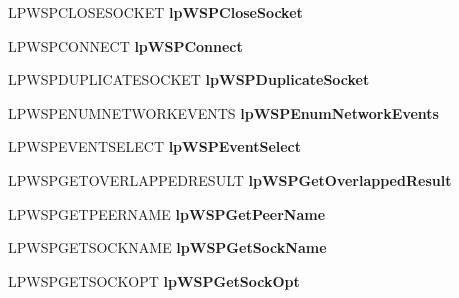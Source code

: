 \begin{DoxyCompactItemize}
L\+P\+W\+S\+P\+C\+L\+O\+S\+E\+S\+O\+C\+K\+ET {\bfseries lp\+W\+S\+P\+Close\+Socket}
\item 
\mbox{\label{struct___w_s_p_p_r_o_c___t_a_b_l_e_aa6f78d8865dce8270c58c33914eecd57}} 
L\+P\+W\+S\+P\+C\+O\+N\+N\+E\+CT {\bfseries lp\+W\+S\+P\+Connect}
\item 
\mbox{\label{struct___w_s_p_p_r_o_c___t_a_b_l_e_ae6a997a41d7a041ebe8ac6eedc61765a}} 
L\+P\+W\+S\+P\+D\+U\+P\+L\+I\+C\+A\+T\+E\+S\+O\+C\+K\+ET {\bfseries lp\+W\+S\+P\+Duplicate\+Socket}
\item 
\mbox{\label{struct___w_s_p_p_r_o_c___t_a_b_l_e_ac87340b48df7256613954854eb04dd40}} 
L\+P\+W\+S\+P\+E\+N\+U\+M\+N\+E\+T\+W\+O\+R\+K\+E\+V\+E\+N\+TS {\bfseries lp\+W\+S\+P\+Enum\+Network\+Events}
\item 
\mbox{\label{struct___w_s_p_p_r_o_c___t_a_b_l_e_a93b29a619eaf54aae3bede3910bc40f2}} 
L\+P\+W\+S\+P\+E\+V\+E\+N\+T\+S\+E\+L\+E\+CT {\bfseries lp\+W\+S\+P\+Event\+Select}
\item 
\mbox{\label{struct___w_s_p_p_r_o_c___t_a_b_l_e_ae85d2b5944fec9a04d3986776a058b62}} 
L\+P\+W\+S\+P\+G\+E\+T\+O\+V\+E\+R\+L\+A\+P\+P\+E\+D\+R\+E\+S\+U\+LT {\bfseries lp\+W\+S\+P\+Get\+Overlapped\+Result}
\item 
\mbox{\label{struct___w_s_p_p_r_o_c___t_a_b_l_e_a46a1d74a124457bf250504c56cb45421}} 
L\+P\+W\+S\+P\+G\+E\+T\+P\+E\+E\+R\+N\+A\+ME {\bfseries lp\+W\+S\+P\+Get\+Peer\+Name}
\item 
\mbox{\label{struct___w_s_p_p_r_o_c___t_a_b_l_e_a2cce40f681a9b0d149bed23e78b869eb}} 
L\+P\+W\+S\+P\+G\+E\+T\+S\+O\+C\+K\+N\+A\+ME {\bfseries lp\+W\+S\+P\+Get\+Sock\+Name}
\item 
\mbox{\label{struct___w_s_p_p_r_o_c___t_a_b_l_e_aa548bd5aed9a30d3241de497acb2f767}} 
L\+P\+W\+S\+P\+G\+E\+T\+S\+O\+C\+K\+O\+PT {\bfseries lp\+W\+S\+P\+Get\+Sock\+Opt}
\item 
\mbox{\label{struct___w_s_p_p_r_o_c___t_a_b_l_e_a7bdee6dc51d8cc57a32ba8982a6b17c4}} 

\end{DoxyCompactItemize}
